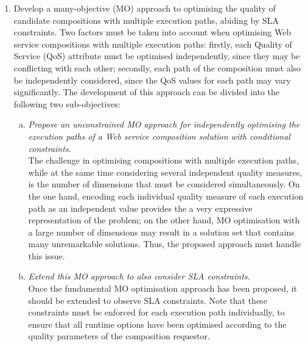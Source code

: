\begin{enumerate}
 \item \label{obj:mo} Develop a many-objective (MO) approach to optimising the quality of candidate compositions with multiple execution paths, abiding by SLA constraints. Two factors must be taken into account when optimising Web service compositions with multiple execution paths: firstly, each Quality of Service (QoS) attribute must be optimised independently, since they may be conflicting with each other; secondly, each path of the composition must also be independently considered, since the QoS values for each path may vary significantly. The development of this approach can be divided into the following two sub-objectives:
 
   \begin{enumerate}[(a)]
    \item \label{obj:simple-mo} \textit{Propose an unconstrained MO approach for independently optimising the execution paths of a Web service composition solution with conditional constraints.}\\
    The challenge in optimising compositions with multiple execution paths, while at the same time considering several independent quality measures, is the number of dimensions that must be considered simultaneously. On the one hand, encoding each individual quality measure of each execution path as an independent value provides the a very expressive representation of the problem; on the other hand, MO optimisation with a large number of dimensions may result in a solution set that contains many unremarkable solutions. Thus, the proposed approach must handle this issue.
    \item \label{obj:sla-mo} \textit{Extend this MO approach to also consider SLA constraints.}\\
    Once the fundamental MO optimisation approach has been proposed, it should be extended to observe SLA constraints. Note that these constraints must be enforced for each execution path individually, to ensure that all runtime options have been optimised according to the quality parameters of the composition requestor.
   \end{enumerate}
 

\end{enumerate}
